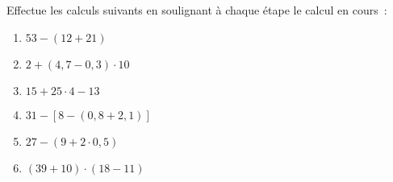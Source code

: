 \begin{exercice}
Effectue les calculs suivants en soulignant à chaque étape le calcul en cours :
\begin{enumerate}
 \item $53 - (12 + 21)$ \dotfill	
 
 \dotfill		
	
 \item $2 + (4,7 - 0,3) \cdot 10$ \dotfill	

 \dotfill	

 \dotfill	
	
 \item $15 + 25 \cdot 4 - 13$ \dotfill          	

 \dotfill

 \dotfill		
	
 \item $31 - [8 - (0,8 + 2,1)]$ \dotfill
	
 \dotfill	

 \dotfill	
	
 \item $27 - (9 + 2 \cdot 0,5)$ \dotfill	

 \dotfill	

 \dotfill	
	
 \item $(39 + 10) \cdot (18 - 11)$ \dotfill
 
 \dotfill	

 \dotfill
\end{enumerate}
\end{exercice}


